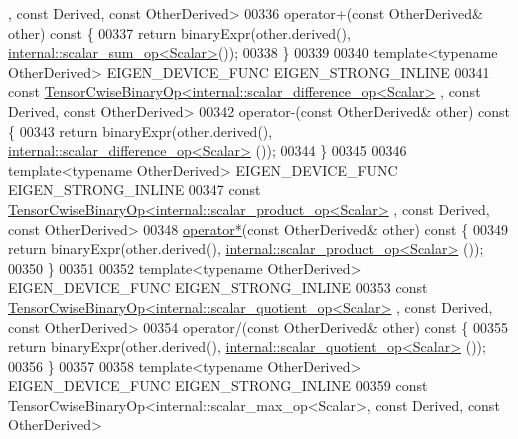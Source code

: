 \begin{DoxyCode}
      , \textcolor{keyword}{const} Derived, \textcolor{keyword}{const} OtherDerived>
00336     operator+(\textcolor{keyword}{const} OtherDerived& other)\textcolor{keyword}{ const }\{
00337       \textcolor{keywordflow}{return} binaryExpr(other.derived(), \hyperlink{struct_eigen_1_1internal_1_1scalar__sum__op}{internal::scalar\_sum\_op<Scalar>}());
00338     \}
00339 
00340     \textcolor{keyword}{template}<\textcolor{keyword}{typename} OtherDerived> EIGEN\_DEVICE\_FUNC EIGEN\_STRONG\_INLINE
00341     \textcolor{keyword}{const} \hyperlink{class_eigen_1_1_tensor_cwise_binary_op}{TensorCwiseBinaryOp<internal::scalar\_difference\_op<Scalar>}
      , \textcolor{keyword}{const} Derived, \textcolor{keyword}{const} OtherDerived>
00342     operator-(\textcolor{keyword}{const} OtherDerived& other)\textcolor{keyword}{ const }\{
00343       \textcolor{keywordflow}{return} binaryExpr(other.derived(), \hyperlink{struct_eigen_1_1internal_1_1scalar__difference__op}{internal::scalar\_difference\_op<Scalar>}
      ());
00344     \}
00345 
00346     \textcolor{keyword}{template}<\textcolor{keyword}{typename} OtherDerived> EIGEN\_DEVICE\_FUNC EIGEN\_STRONG\_INLINE
00347     \textcolor{keyword}{const} \hyperlink{class_eigen_1_1_tensor_cwise_binary_op}{TensorCwiseBinaryOp<internal::scalar\_product\_op<Scalar>}
      , \textcolor{keyword}{const} Derived, \textcolor{keyword}{const} OtherDerived>
00348     \hyperlink{namespace_eigen_a32970f7eb62fe31eeefee72d24a046d0}{operator*}(\textcolor{keyword}{const} OtherDerived& other)\textcolor{keyword}{ const }\{
00349       \textcolor{keywordflow}{return} binaryExpr(other.derived(), \hyperlink{struct_eigen_1_1internal_1_1scalar__product__op}{internal::scalar\_product\_op<Scalar>}
      ());
00350     \}
00351 
00352     \textcolor{keyword}{template}<\textcolor{keyword}{typename} OtherDerived> EIGEN\_DEVICE\_FUNC EIGEN\_STRONG\_INLINE
00353     \textcolor{keyword}{const} \hyperlink{class_eigen_1_1_tensor_cwise_binary_op}{TensorCwiseBinaryOp<internal::scalar\_quotient\_op<Scalar>}
      , \textcolor{keyword}{const} Derived, \textcolor{keyword}{const} OtherDerived>
00354     operator/(\textcolor{keyword}{const} OtherDerived& other)\textcolor{keyword}{ const }\{
00355       \textcolor{keywordflow}{return} binaryExpr(other.derived(), \hyperlink{struct_eigen_1_1internal_1_1scalar__quotient__op}{internal::scalar\_quotient\_op<Scalar>}
      ());
00356     \}
00357 
00358     \textcolor{keyword}{template}<\textcolor{keyword}{typename} OtherDerived> EIGEN\_DEVICE\_FUNC EIGEN\_STRONG\_INLINE
00359     \textcolor{keyword}{const} TensorCwiseBinaryOp<internal::scalar\_max\_op<Scalar>, \textcolor{keyword}{const} Derived, \textcolor{keyword}{const} OtherDerived>

\end{DoxyCode}
